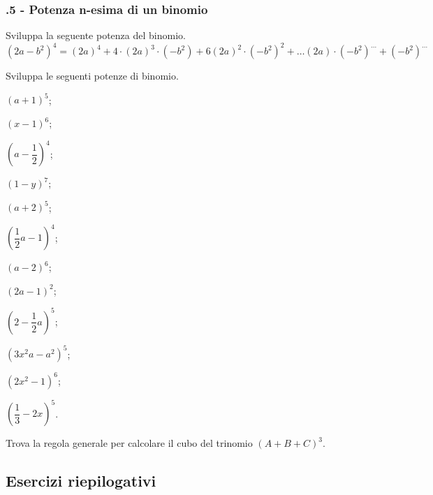  \subsubsection*{\thechapter.5 - Potenza n-esima di un binomio}

\begin{esercizio}
 \label{ese:11.28}
 Sviluppa la seguente potenza del binomio.
 \[\left(2a-b^{2}\right)^{4}=\left(2a\right)^{4}+4\cdot
\left(2a\right)^{3}\cdot \left(-b^{2}\right)+6\left(2a\right)^{2}\cdot
\left(-b^{2}\right)^{2}+\ldots \left(2a\right)\cdot
\left(-b^{2}\right)^{\ldots }+\left(-b^{2}\right)^{\ldots }\]
\end{esercizio}

\begin{esercizio}
 \label{ese:11.29}
 Sviluppa le seguenti potenze di binomio.
 \begin{multicols}{4}
 \begin{enumeratea}
 \spazielenx
\item $\left(a+1\right)^{5}$;
\item $\left(x-1\right)^{6}$;
\item $\left(a-\dfrac{1}{2}\right)^{4}$;
\item $\left(1-y\right)^{7}$;
\item $\left(a+2\right)^{5}$;
\item $\left(\dfrac{1}{2}a-1\right)^{4}$;
\item $\left(a-2\right)^{6}$;
\item $\left(2a-1\right)^{2}$;
\item $\left(2-\dfrac{1}{2}a\right)^{5}$;
\item $\left(3x^{2}a-a^{2}\right)^{5}$;
\item $\left(2x^{2}-1\right)^{6}$;
\item $\left(\dfrac{1}{3}-2x\right)^{5}$.
\end{enumeratea}
 \end{multicols}
\end{esercizio}

\begin{esercizio}
 \label{ese:11.30}
 Trova la regola generale per calcolare il cubo del trinomio
$(A+B+C)^{3}$.
\end{esercizio}

\subsection{Esercizi riepilogativi}

